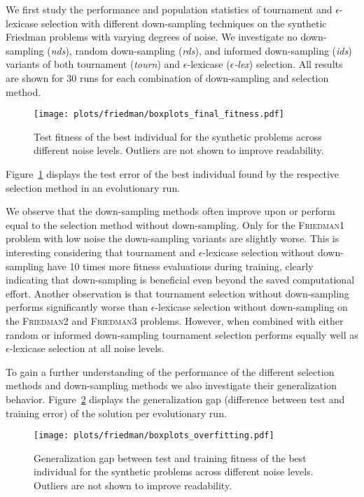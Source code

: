 \documentclass[runningheads]{llncs}
\begin{document}
We first study the performance and population statistics of tournament and $\epsilon$-lexicase selection with different down-sampling techniques on the synthetic Friedman problems with varying degrees of noise. We investigate no down-sampling (\textit{nds}), random down-sampling (\textit{rds}), and informed down-sampling (\textit{ids}) variants of both tournament (\textit{tourn}) and $\epsilon$-lexicase (\textit{$\epsilon$-lex}) selection. All results are shown for 30 runs for each combination of down-sampling and selection method.

\begin{figure}
    \centering
    \texttt{[image: plots/friedman/boxplots\_final\_fitness.pdf]}
    \caption{Test fitness of the best individual for the synthetic problems across different noise levels. Outliers are not shown to improve readability.}
    \label{fig:friedman-test_fitness_boxplots}
\end{figure}

Figure~\ref{fig:friedman-test_fitness_boxplots} displays the test error of the best individual found by the respective selection method in an evolutionary run. 

We observe that the down-sampling methods often improve upon or perform equal to the selection method without down-sampling. Only for the \textsc{Friedman1} problem with low noise the down-sampling variants are slightly worse. This is interesting considering that tournament and $\epsilon$-lexicase selection without down-sampling have 10 times more fitness evaluations during training, clearly indicating that down-sampling is beneficial even beyond the saved computational effort. 
Another observation is that tournament selection without down-sampling performs significantly worse than $\epsilon$-lexicase selection without down-sampling on the \textsc{Friedman2} and \textsc{Friedman3} problems. However, when combined with either random or informed down-sampling tournament selection performs equally well as $\epsilon$-lexicase selection at all noise levels. 

To gain a further understanding of the performance of the different selection methods and down-sampling methods we also investigate their generalization behavior. Figure~\ref{fig:friedman-overfitting_boxplots} displays the generalization gap (difference between test and training error) of the solution per evolutionary run.


\begin{figure}
    \centering
    \texttt{[image: plots/friedman/boxplots\_overfitting.pdf]}
    \caption{Generalization gap between test and training fitness of the best individual for the synthetic problems across different noise levels. Outliers are not shown to improve readability.}
    \label{fig:friedman-overfitting_boxplots}
\end{figure}
\end{document}
